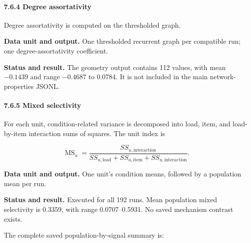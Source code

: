 \documentclass[
  10pt,
]{article}
\begin{document}
\hypertarget{degree-assortativity}{%
\paragraph{7.6.4 Degree assortativity}\label{degree-assortativity}}

Degree assortativity is computed on the thresholded graph.

\textbf{Data unit and output.} One thresholded recurrent graph per
compatible run; one degree-assortativity coefficient.

\textbf{Status and result.} The geometry output contains 112 values,
with mean \(-0.1439\) and range \(-0.4687\) to 0.0784. It is not
included in the main network-properties JSONL.

\hypertarget{mixed-selectivity}{%
\paragraph{7.6.5 Mixed selectivity}\label{mixed-selectivity}}

For each unit, condition-related variance is decomposed into load, item,
and load-by-item interaction sums of squares. The unit index is

\[
\operatorname{MS}_u
=
\frac{SS_{u,\mathrm{interaction}}}
{SS_{u,\mathrm{load}}+SS_{u,\mathrm{item}}+SS_{u,\mathrm{interaction}}}.
\]

\textbf{Data unit and output.} One unit's condition means, followed by a
population mean per run.

\textbf{Status and result.} Executed for all 192 runs. Mean population
mixed selectivity is 0.3359, with range 0.0707--0.5931. No saved
mechanism contrast exists.

The complete saved population-by-signal summary is:
\end{document}
